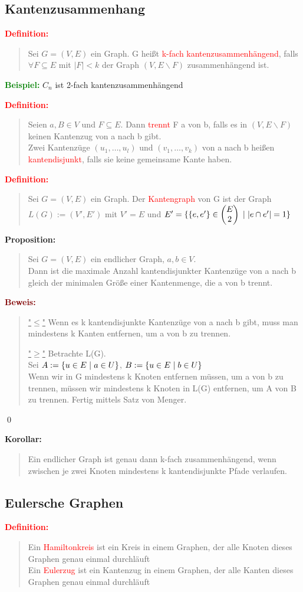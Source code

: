 \documentclass{article}
\newcommand{\smsp}{\phantom{\hspace{3px}}}
\newcommand{\red}[1]{\textcolor{red}{#1}}
\newcommand{\green}[1]{\textcolor{green}{#1}}
\newcommand{\dgr}[1]{\textcolor{dgr}{#1}}
\newcommand{\maroon}[1]{\textcolor{maroon}{#1}}
\newcommand{\ex}{\green{\textbf{Beispiel: }}}
\newcommand{\de}[1]{\red{\textbf{Definition: }}\begin{quote}#1\end{quote}}
\newcommand{\prop}[1]{\dgr{\textbf{Proposition: }}\begin{quote}#1\end{quote}}
\newcommand{\co}[1]{\dgr{\textbf{Korollar: }}\begin{quote}#1\end{quote}}
\newcommand{\pr}[1]{\maroon{\textbf{Beweis: }}\begin{quote}#1\end{quote}\qed}
\renewcommand{\st}{\smsp | \smsp}
\newcommand{\vvec}[2]{\begin{pmatrix}#1\\#2\end{pmatrix}}
\begin{document}
\subsection{Kantenzusammenhang}

\de{
    Sei $G=(V,E)$ ein Graph. G heißt \red{k-fach kantenzusammenhängend}, falls $\forall F \subseteq E$ mit $|F| < k$ der Graph $(V, E \backslash F)$ zusammenhängend ist.
}

\ex $C_n$ ist 2-fach kantenzusammenhängend

\newpage
\de{
    Seien $a,B \in V$ und $F \subseteq E$. Dann \red{trennt} F a von b, falls es in $(V, E \backslash F)$ keinen Kantenzug von a nach b gibt.\\
    Zwei Kantenzüge $(u_1, \dots, u_l)$ und $(v_1, \dots, v_k)$ von a nach b heißen \red{kantendisjunkt}, falls sie keine gemeinsame Kante haben.
}

\de{
    Sei $G=(V,E)$ ein Graph. Der \red{Kantengraph} von G ist der Graph $L(G) := (V',E')$ mit $V' = E$ und $E' = \{\{e,e'\} \in \vvec{E}{2} \st |e \cap e'| = 1\}$
}

\prop{
    Sei $G=(V,E)$ ein endlicher Graph, $a,b \in V$.\\
    Dann ist die maximale Anzahl kantendisjunkter Kantenzüge von a nach b gleich der minimalen Größe einer Kantenmenge, die a von b trennt.
}

\pr{
    \underline{"$\le$"} Wenn es k kantendisjunkte Kantenzüge von a nach b gibt, muss man mindestens k Kanten entfernen, um a von b zu trennen.

    \underline{"$\ge$"} Betrachte L(G).\\
    Sei $A := \{u \in E \st a \in U\}$, $B := \{u \in E \st b \in U\}$\\
    Wenn wir in G mindestens k Knoten entfernen müssen, um a von b zu trennen, müssen wir mindestens k Knoten in L(G) entfernen, um A von B zu trennen. Fertig mittels Satz von Menger.
}

\co{
    Ein endlicher Graph ist genau dann k-fach zusammenhängend, wenn zwischen je zwei Knoten mindestens k kantendisjunkte Pfade verlaufen.
}

\subsection{Eulersche Graphen}

\de{
    Ein \red{Hamiltonkreis} ist ein Kreis in einem Graphen, der alle Knoten dieses Graphen genau einmal durchläuft\\
    Ein \red{Eulerzug} ist ein Kantenzug in einem Graphen, der alle Kanten dieses Graphen genau einmal durchläuft
}
\end{document}
